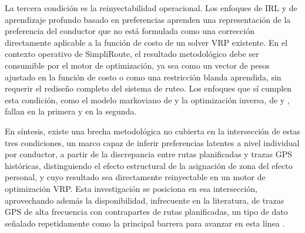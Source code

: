 La tercera condición es la reinyectabilidad operacional. Los enfoques de IRL y de aprendizaje profundo basado en preferencias \cite{zhang2024recursive, pan2025preference} aprenden una representación de la preferencia del conductor que no está formulada como una corrección directamente aplicable a la función de costo de un solver VRP existente. En el contexto operativo de SimpliRoute, el resultado metodológico debe ser consumible por el motor de optimización, ya sea como un vector de pesos ajustado en la función de costo o como una restricción blanda aprendida, sin requerir el rediseño completo del sistema de ruteo. Los enfoques que sí cumplen esta condición, como el modelo markoviano de  y la optimización inversa, de  y , fallan en la primera y en la segunda.

En síntesis, existe una brecha metodológica no cubierta en la intersección de estas tres condiciones, un marco capaz de inferir preferencias latentes a nivel individual por conductor, a partir de la discrepancia entre rutas planificadas y trazas GPS históricas, distinguiendo el efecto estructural de la asignación de zona del efecto personal, y cuyo resultado sea directamente reinyectable en un motor de optimización VRP. Esta investigación se posiciona en esa intersección, aprovechando además la disponibilidad, infrecuente en la literatura, de trazas GPS de alta frecuencia con contrapartes de rutas planificadas, un tipo de dato señalado repetidamente como la principal barrera para avanzar en esta línea \cite{merchan20242021, cook2024constrained}.